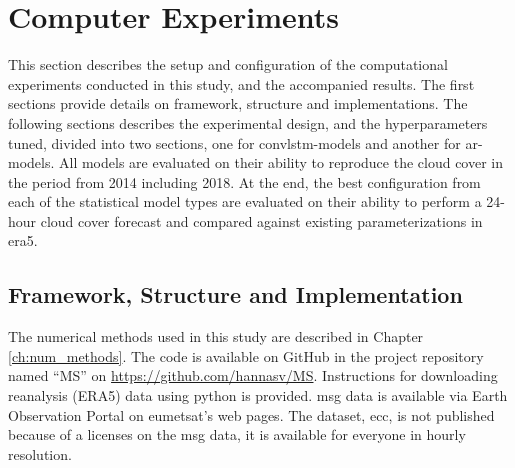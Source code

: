 \section{Computer Experiments} \label{ch:computer_experiments}
This section describes the setup and configuration of the computational experiments conducted in this study, and the accompanied results. The first sections provide details on framework, structure and implementations. The following sections describes the experimental design, and the hyperparameters tuned, 
divided into two sections, one for \acrshort{convlstm}-models and another for \acrshort{ar}-models. All models are evaluated on their ability to reproduce the cloud cover in the period from 2014 including 2018. At the end, the best configuration from each of the statistical model types are evaluated on their ability to perform a 24-hour cloud cover forecast and compared against existing parameterizations in \acrshort{era5}.

\subsection{Framework, Structure and Implementation} \label{sec:structure_and_implementations} \label{sec:framework}
The numerical methods used in this study are described in Chapter \ref{ch:num_methods}. The code is available on GitHub in the project repository named ``MS'' on \href{https://github.com/hannasv/MS}{https://github.com/hannasv/MS}. Instructions for downloading 
reanalysis (ERA5) data using python is provided. \acrshort{msg} data is available via Earth Observation Portal on \acrshort{eumetsat}'s web pages. 
The dataset, \acrshort{ecc}, is not published because of a licenses on the \acrshort{msg} data, it is available for everyone in hourly resolution. 

